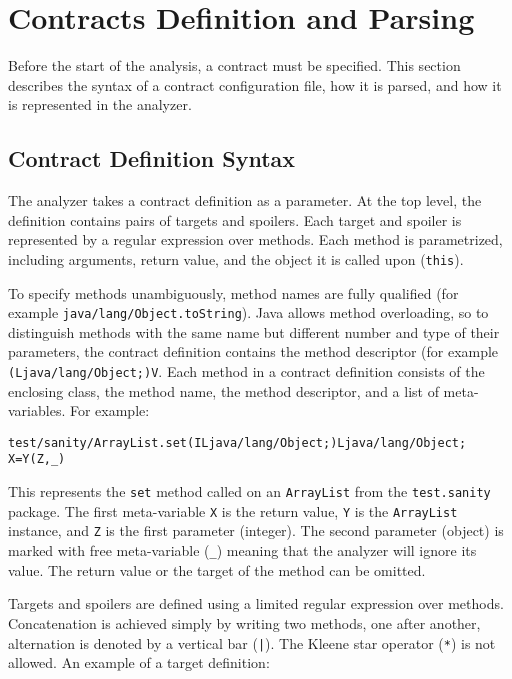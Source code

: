 \section{Contracts Definition and Parsing}
\label{contracts}

Before the start of the analysis, a contract must be specified. This section
describes the syntax of a contract configuration file, how it is parsed, and how
it is represented in the analyzer.

\subsection{Contract Definition Syntax}

The analyzer takes a contract definition as a parameter. At the top level, the
definition contains pairs of targets and spoilers. Each target and spoiler is
represented by a regular expression over methods. Each method is parametrized,
including arguments, return value, and the object it is called upon
(\texttt{this}).

To specify methods unambiguously, method names are fully qualified (for example
\texttt{java/lang/Object.toString}). Java allows method overloading, so to
distinguish methods with the same name but different number and type of their
parameters, the contract definition contains the method descriptor (for example
\texttt{(Ljava/lang/Object;)V}.  Each method in a contract definition consists of the
enclosing class, the method name, the method descriptor, and a list of
meta-variables. For example:

\begin{lstlisting}
test/sanity/ArrayList.set(ILjava/lang/Object;)Ljava/lang/Object; X=Y(Z,_)
\end{lstlisting}

This represents the \texttt{set} method called on an \texttt{ArrayList} from
the \texttt{test.sanity} package. The first meta-variable \texttt{X} is the
return value, \texttt{Y} is the \texttt{ArrayList} instance, and \texttt{Z} is
the first parameter (integer). The second parameter (object) is marked with free
meta-variable (\texttt{\_}) meaning that the analyzer will ignore its value. The
return value or the target of the method can be omitted.

Targets and spoilers are defined using a limited regular expression over
methods. Concatenation is achieved simply by writing two methods, one after
another, alternation is denoted by a vertical bar (\texttt{|}). The Kleene star
operator (\texttt{*}) is not allowed. An example of a target definition:


